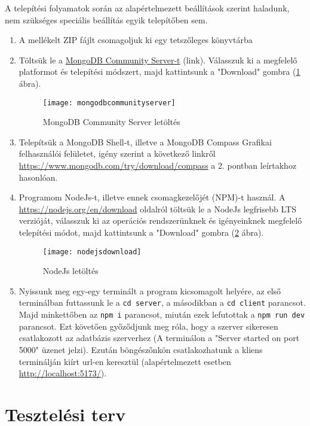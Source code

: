 A telepítési folyamatok során az alapértelmezett beállítások szerint haladunk, nem szükséges speciális beállítás egyik telepítőben sem.

\begin{enumerate}
	\item A mellékelt ZIP fájlt csomagoljuk ki egy tetszőleges könyvtárba
	\item Töltsük le a \href{https://www.mongodb.com/try/download/community}{MongoDB Community Server-t} (link). Válasszuk ki a megfelelő platformot és telepítési módszert, majd kattintsunk a "Download" gombra (\ref{fig:mongodbcommunityserver} ábra).
	\begin{figure}[H]
		\centering
		\texttt{[image: mongodbcommunityserver]}
		\caption{MongoDB Community Server letöltés}
		\label{fig:mongodbcommunityserver}
	\end{figure}
	\item Telepítsük a MongoDB Shell-t, illetve a MongoDB Compass Grafikai felhasználói felületet, igény szerint a következő linkről \url{https://www.mongodb.com/try/download/compass} a 2. pontban leírtakhoz hasonlóan.
	\item Programom NodeJs-t, illetve ennek csomagkezelőjét (NPM)-t használ. A \url{https://nodejs.org/en/download} oldalról töltsük le a NodeJs legfrisebb LTS verzióját, válasszuk ki az operációs rendszerünknek és igényeinknek megfelelő telepítési módot, majd kattintsunk a "Download" gombra (\ref{fig:nodejsdownload} ábra).
	\begin{figure}[H]
		\centering
		\texttt{[image: nodejsdownload]}
		\caption{NodeJs letöltés}
		\label{fig:nodejsdownload}
	\end{figure}

	\item Nyissunk meg egy-egy terminált a program kicsomagolt helyére, az első terminálban futtassunk le a \texttt{cd server}, a másodikban a \texttt{cd client} parancsot. Majd minkettőben az \texttt{npm i} parancsot, miután ezek lefutottak a \texttt{npm run dev} parancsot. Ezt követően győződjunk meg róla, hogy a szerver sikeresen csatlakozott az adatbázis szerverhez (A terminálon a "Server started on port 5000" üzenet jelzi). Ezután böngészőnkön csatlakozhatunk a kliens terminálján kiírt url-en keresztül (alapértelmezett esetben \url{http://localhost:5173/}).
\end{enumerate}


\section{Tesztelési terv}

